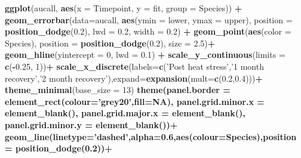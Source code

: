 \documentclass[]{article}
\newenvironment{Shaded}{\begin{snugshade}}{\end{snugshade}}
\newcommand{\DataTypeTok}[1]{\textcolor[rgb]{0.13,0.29,0.53}{#1}}
\newcommand{\DecValTok}[1]{\textcolor[rgb]{0.00,0.00,0.81}{#1}}
\newcommand{\FloatTok}[1]{\textcolor[rgb]{0.00,0.00,0.81}{#1}}
\newcommand{\KeywordTok}[1]{\textcolor[rgb]{0.13,0.29,0.53}{\textbf{#1}}}
\newcommand{\NormalTok}[1]{#1}
\newcommand{\OperatorTok}[1]{\textcolor[rgb]{0.81,0.36,0.00}{\textbf{#1}}}
\newcommand{\OtherTok}[1]{\textcolor[rgb]{0.56,0.35,0.01}{#1}}
\newcommand{\StringTok}[1]{\textcolor[rgb]{0.31,0.60,0.02}{#1}}
\begin{document}
\begin{Shaded}
\begin{Highlighting}[]
\KeywordTok{ggplot}\NormalTok{(aucall, }\KeywordTok{aes}\NormalTok{(}\DataTypeTok{x =}\NormalTok{ Timepoint, }\DataTypeTok{y =}\NormalTok{ fit, }\DataTypeTok{group =}\NormalTok{ Species)) }\OperatorTok{+}
\StringTok{  }\KeywordTok{geom_errorbar}\NormalTok{(}\DataTypeTok{data=}\NormalTok{aucall, }\KeywordTok{aes}\NormalTok{(}\DataTypeTok{ymin =}\NormalTok{ lower, }\DataTypeTok{ymax =}\NormalTok{ upper), }
                \DataTypeTok{position =} \KeywordTok{position_dodge}\NormalTok{(}\FloatTok{0.2}\NormalTok{), }\DataTypeTok{lwd =} \FloatTok{0.2}\NormalTok{, }\DataTypeTok{width =} \FloatTok{0.2}\NormalTok{) }\OperatorTok{+}
\StringTok{  }\KeywordTok{geom_point}\NormalTok{(}\KeywordTok{aes}\NormalTok{(}\DataTypeTok{color =}\NormalTok{ Species),}
             \DataTypeTok{position =} \KeywordTok{position_dodge}\NormalTok{(}\FloatTok{0.2}\NormalTok{), }\DataTypeTok{size =} \FloatTok{2.5}\NormalTok{)}\OperatorTok{+}
\StringTok{  }\KeywordTok{geom_hline}\NormalTok{(}\DataTypeTok{yintercept =} \DecValTok{0}\NormalTok{, }\DataTypeTok{lwd =} \FloatTok{0.1}\NormalTok{) }\OperatorTok{+}
\StringTok{  }\KeywordTok{scale_y_continuous}\NormalTok{(}\DataTypeTok{limits =} \KeywordTok{c}\NormalTok{(}\OperatorTok{-}\FloatTok{0.25}\NormalTok{, }\DecValTok{1}\NormalTok{))}\OperatorTok{+}
\StringTok{  }\KeywordTok{scale_x_discrete}\NormalTok{(}\DataTypeTok{labels=}\KeywordTok{c}\NormalTok{(}\StringTok{'Post heat stress'}\NormalTok{,}\StringTok{'1 month recovery'}\NormalTok{,}\StringTok{'2 month recovery'}\NormalTok{),}\DataTypeTok{expand=}\KeywordTok{expansion}\NormalTok{(}\DataTypeTok{mult=}\KeywordTok{c}\NormalTok{(}\FloatTok{0.2}\NormalTok{,}\FloatTok{0.4}\NormalTok{)))}\OperatorTok{+}
\StringTok{  }\KeywordTok{theme_minimal}\NormalTok{(}\DataTypeTok{base_size =} \DecValTok{13}\NormalTok{)}\OperatorTok{%+replace%}
\StringTok{   }\KeywordTok{theme}\NormalTok{(}\DataTypeTok{panel.border =} \KeywordTok{element_rect}\NormalTok{(}\DataTypeTok{colour=}\StringTok{'grey20'}\NormalTok{,}\DataTypeTok{fill=}\OtherTok{NA}\NormalTok{),}
          \DataTypeTok{panel.grid.minor.x =} \KeywordTok{element_blank}\NormalTok{(),}
         \DataTypeTok{panel.grid.major.x =} \KeywordTok{element_blank}\NormalTok{(),}
          \DataTypeTok{panel.grid.minor.y =} \KeywordTok{element_blank}\NormalTok{())}\OperatorTok{+}
\StringTok{  }\KeywordTok{geom_line}\NormalTok{(}\DataTypeTok{linetype=}\StringTok{'dashed'}\NormalTok{,}\DataTypeTok{alpha=}\FloatTok{0.6}\NormalTok{,}\KeywordTok{aes}\NormalTok{(}\DataTypeTok{colour=}\NormalTok{Species),}\DataTypeTok{position =} \KeywordTok{position_dodge}\NormalTok{(}\FloatTok{0.2}\NormalTok{))}\OperatorTok{+}
}
\end{Highlighting}
\end{Shaded}
\end{document}
